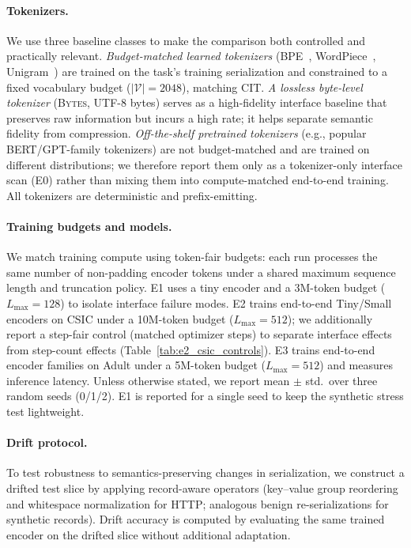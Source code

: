 \paragraph{Tokenizers.}
We use three baseline classes to make the comparison both controlled and practically relevant.
\emph{Budget-matched learned tokenizers} (BPE~\cite{sennrich2016neural}, WordPiece~\cite{schuster2012japanese}, Unigram~\cite{kudo2018subword}) are trained on the task's training serialization and constrained to a fixed vocabulary budget ($|\mathcal{V}|{=}2048$), matching CIT.
\emph{A lossless byte-level tokenizer} (\textsc{Bytes}, UTF-8 bytes) serves as a high-fidelity interface baseline that preserves raw information but incurs a high rate; it helps separate semantic fidelity from compression.
\emph{Off-the-shelf pretrained tokenizers} (e.g., popular BERT/GPT-family tokenizers) are not budget-matched and are trained on different distributions; we therefore report them only as a tokenizer-only interface scan (E0) rather than mixing them into compute-matched end-to-end training.
All tokenizers are deterministic and prefix-emitting.

\paragraph{Training budgets and models.}
We match training compute using token-fair budgets: each run processes the same number of non-padding encoder tokens under a shared maximum sequence length and truncation policy.
E1 uses a tiny encoder and a 3M-token budget ($L_{\max}{=}128$) to isolate interface failure modes.
E2 trains end-to-end Tiny/Small encoders on CSIC under a 10M-token budget ($L_{\max}{=}512$); we additionally report a step-fair control (matched optimizer steps) to separate interface effects from step-count effects (Table~\ref{tab:e2_csic_controls}).
E3 trains end-to-end encoder families on Adult under a 5M-token budget ($L_{\max}{=}512$) and measures inference latency.
Unless otherwise stated, we report mean $\pm$ std.\ over three random seeds (0/1/2). E1 is reported for a single seed to keep the synthetic stress test lightweight.

\paragraph{Drift protocol.}
To test robustness to semantics-preserving changes in serialization, we construct a drifted test slice by applying record-aware operators (key--value group reordering and whitespace normalization for HTTP; analogous benign re-serializations for synthetic records).
Drift accuracy is computed by evaluating the same trained encoder on the drifted slice without additional adaptation.

